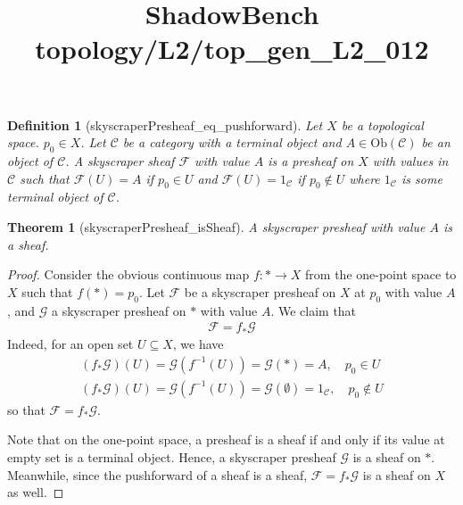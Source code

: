 \documentclass{article}
\title{ShadowBench topology/L2/top\_gen\_L2\_012}
\newtheorem{theorem}{Theorem}
\newtheorem{definition}{Definition}
\begin{document}
\maketitle

\begin{definition}[skyscraperPresheaf_eq_pushforward]
    Let $X$ be a topological space. $p_0 \in X$. Let $\mathcal{C}$ be a category with a terminal object and $A \in \text{Ob}(\mathcal{C})$ be an object of $\mathcal{C}$. A skyscraper sheaf $\mathcal{F}$ with value $A$ is a presheaf on $X$ with values in $\mathcal{C}$ such that
    $\mathcal{F}(U) = A$ if $p_0 \in U$ and $\mathcal{F}(U) = 1_\mathcal{C}$ if $p_0 \notin U$ where $1_\mathcal{C}$ is some terminal object of $\mathcal{C}$.
\end{definition}

\begin{theorem}[skyscraperPresheaf_isSheaf]
    A skyscraper presheaf with value $A$ is a sheaf.
\end{theorem}
\begin{proof}
    Consider the obvious continuous map $f: * \to X$ from the one-point space to $X$ such that $f(*) = p_0$. Let $\mathcal{F}$ be a skyscraper presheaf on $X$ at $p_0$ with value $A$, and $\mathcal{G}$ a skyscraper presheaf on $*$ with value $A$. We claim that
    \begin{align*}
        \mathcal{F} = f_*\mathcal{G}
    \end{align*}
    Indeed, for an open set $U \subseteq X$, we have
    \begin{align*}
        (f_*\mathcal{G})(U) = \mathcal{G}(f^{-1}(U)) = \mathcal{G}(*) = A, \quad p_0 \in U \\
        (f_*\mathcal{G})(U) = \mathcal{G}(f^{-1}(U)) = \mathcal{G}(\emptyset) = 1_\mathcal{C}, \quad p_0 \notin U
    \end{align*}
    so that $\mathcal{F} = f_*\mathcal{G}$.

    Note that on the one-point space, a presheaf is a sheaf if and only if its value at empty set is a terminal object. Hence, a skyscraper presheaf $\mathcal{G}$ is a sheaf on $*$. Meanwhile, since the pushforward of a sheaf is a sheaf, $\mathcal{F} = f_*\mathcal{G}$ is a sheaf on $X$ as well.
\end{proof}
\end{document}
